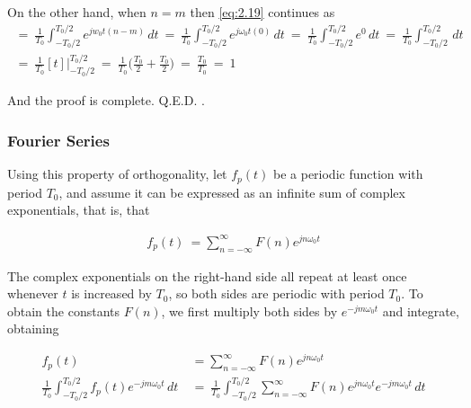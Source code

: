 \documentclass[10pt]{article}
\begin{document}
\noindent
On the other hand, when $n = m$ then \eqref{eq:2.19} continues as
\begin{equation} \label{eq:2.21}
\begin{aligned}
    \: = \: \frac{1}{T_0}\int_{-T_0/2}^{T_0/2} e^{jw_0t(n-m)} \,dt \: = \: \frac{1}{T_0}\int_{-T_0/2}^{T_0/2} e^{j\omega_0t(0)} \,dt \: = \: \frac{1}{T_0}\int_{-T_0/2}^{T_0/2} e^{0} \,dt  \: = \: 
    \frac{1}{T_0}\int_{-T_0/2}^{T_0/2} \,dt \\
    \: = \: \frac{1}{T_0}[t]\Big|_{-T_0/2}^{T_0/2} \: = \: \frac{1}{T_0}\Big(\frac{T_0}{2} + \frac{T_0}{2}\Big) \: = \: \frac{T_0}{T_0} \: = \: 1
\end{aligned}
\end{equation}

\noindent
And the proof is complete. \quad Q.E.D. \:\:  \cite{morrison1994fourier}.


\subsubsection{Fourier Series}
\hspace{\parindent} Using this property of orthogonality, let $f_p(t)$ be a periodic function with period $T_0$, and assume it can be expressed as an infinite sum of complex exponentials, that is, that

\begin{equation} \label{eq:2.22}
\begin{aligned}
    f_p(t) \: = \sum_{n=-\infty}^{\infty} F(n) e^{jn\omega_0t}
\end{aligned}
\end{equation}

The complex exponentials on the right-hand side all repeat at least once whenever $t$ is increased by $T_0$, so both sides are periodic with period $T_0$. To obtain the constants $F(n)$, we first multiply both sides by $e^{-jm\omega_0t}$ and integrate, obtaining


\begin{equation} \label{eq:2.23}
	\begin{aligned}
		f_p(t) \: &= \sum_{n=-\infty}^{\infty} F(n) e^{jn\omega_0t} \\
		\frac{1}{T_0}\int_{-T_0/2}^{T_0/2} f_p(t) e^{-jm\omega_0t} \,dt \: &= \: \frac{1}{T_0}\int_{-T_0/2}^{T_0/2}\sum_{n=-\infty}^{\infty} F(n) e^{jn\omega_0t} e^{-jm\omega_0t} \,dt \\
	\end{aligned}
\end{equation}
\end{document}
